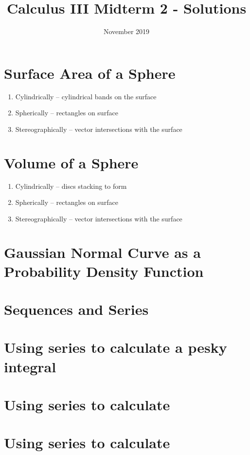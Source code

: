 \documentclass{article}
\title{Calculus III Midterm 2 - Solutions}
\date{November 2019}
\begin{document}
\maketitle

\section{Surface Area of a Sphere}
\begin{enumerate}
	\item Cylindrically -- cylindrical bands on the surface
	\item Spherically -- rectangles on surface
	\item Stereographically -- vector intersections with the surface
\end{enumerate}

\section{Volume of a Sphere}
\begin{enumerate}
	\item Cylindrically -- discs stacking to form
	\item Spherically -- rectangles on surface
	\item Stereographically -- vector intersections with the surface
\end{enumerate}

\section{Gaussian Normal Curve as a Probability Density Function}

\section{Sequences and Series}

\section{Using series to calculate a pesky integral}

\section{Using series to calculate \pi}

\section{Using series to calculate}
\end{document}
